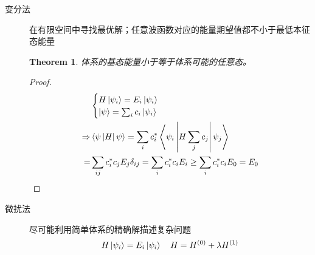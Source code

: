 \documentclass[12pt,a4paper,openany,twoside]{book}
\newtheorem{theorem}{Theorem}[section]
\numberwithin{equation}{section}
\newcommand{\bracketl}[3]{\left\langle #1 \left| #2 \right| #3 \right\rangle}
\begin{document}
        \begin{description}
          \item[变分法] 在有限空间中寻找最优解；任意波函数对应的能量期望值都不小于最低本征态能量

            \begin{theorem}
              体系的基态能量小于等于体系可能的任意态。
            \end{theorem}

            \begin{proof}
              \begin{align}
                &\begin{cases}
                  H\ket{\psi_i} = E_i\ket{\psi_i}\\
                  \ket{\psi}=\sum_i c_i \ket{\psi_i}
                \end{cases}\\
                \Rightarrow & \bracketl{\psi}{H}{\psi} = \sum_i c_i^* \bracketl{\psi_i}{H \sum_j c_j}{\psi_j} \\
                =& \sum_{ij}c_i^*c_j E_j \delta_{ij}=\sum_i c_i^* c_i E_i \geq \sum_i c_i^* c_i E_{0}=E_{0}
              \end{align}
            \end{proof}

          \item[微扰法] 尽可能利用简单体系的精确解描述复杂问题
            \begin{equation}
              H\ket{\psi_i}=E_i\ket{\psi_i} \quad H=H^{(0)} +\lambda H^{(1)}
            \end{equation}


\end{description}
\end{document}
